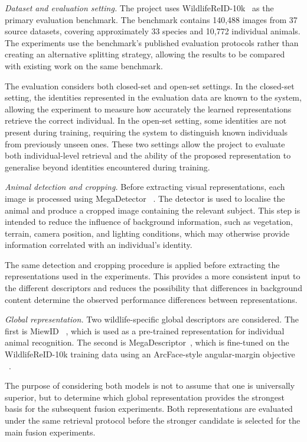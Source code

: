 \documentclass[runningheads]{llncs}
\begin{document}
\emph{Dataset and evaluation setting.}
The project uses WildlifeReID-10k~\cite{adam2025wildlifereid} as the primary evaluation benchmark.
The benchmark contains 140,488 images from 37 source datasets, covering approximately 33 species
and 10,772 individual animals. The experiments use the benchmark's published evaluation protocols
rather than creating an alternative splitting strategy, allowing the results to be compared with
existing work on the same benchmark.

The evaluation considers both closed-set and open-set settings. In the closed-set setting, the
identities represented in the evaluation data are known to the system, allowing the experiment to
measure how accurately the learned representations retrieve the correct individual. In the open-set
setting, some identities are not present during training, requiring the system to distinguish known
individuals from previously unseen ones. These two settings allow the project to evaluate both
individual-level retrieval and the ability of the proposed representation to generalise beyond
identities encountered during training.

\emph{Animal detection and cropping.}
Before extracting visual representations, each image is processed using MegaDetector
~\cite{beery2019megadetector}. The detector is used to localise the animal and produce a cropped
image containing the relevant subject. This step is intended to reduce the influence of background
information, such as vegetation, terrain, camera position, and lighting conditions, which may
otherwise provide information correlated with an individual's identity.

The same detection and cropping procedure is applied before extracting the representations used in
the experiments. This provides a more consistent input to the different descriptors and reduces the
possibility that differences in background content determine the observed performance differences
between representations.

\emph{Global representation.}
Two wildlife-specific global descriptors are considered. The first is MiewID
~\cite{otarashvili2024multispecies}, which is used as a pre-trained representation for individual animal
recognition. The second is MegaDescriptor~\cite{cermak2024wildlifedatasets}, which is fine-tuned on
the WildlifeReID-10k training data using an ArcFace-style angular-margin objective
~\cite{deng2019arcface}.

The purpose of considering both models is not to assume that one is universally superior, but to
determine which global representation provides the strongest basis for the subsequent fusion
experiments. Both representations are evaluated under the same retrieval protocol before the
stronger candidate is selected for the main fusion experiments.
\end{document}

